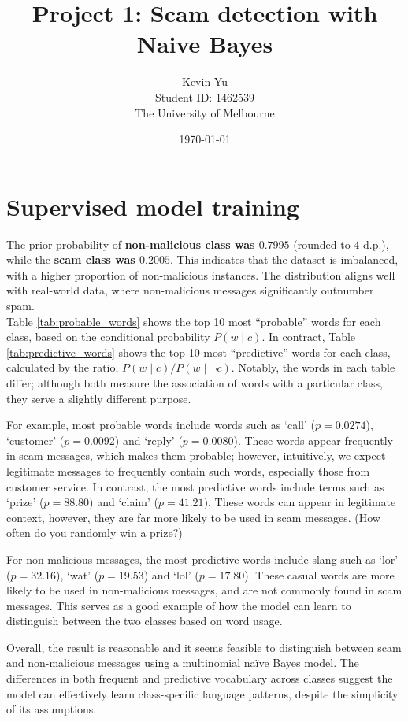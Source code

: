 \documentclass[a4paper,12pt]{article}
\title{Project 1: Scam detection with Naive Bayes}
\author{Kevin Yu \\ Student ID: 1462539 \\ The University of Melbourne}
\date{\today}
\begin{document}
\maketitle

\newpage

\section{Supervised model training}

The prior probability of \textbf{non-malicious class was $0.7995$} (rounded to $4$ d.p.), while the \textbf{scam class was $0.2005$}. This indicates that the dataset is imbalanced, with a higher proportion of non-malicious instances. The distribution aligns well with real-world data, where non-malicious messages significantly outnumber spam. \\

Table \ref{tab:probable_words} shows the top 10 most ``probable'' words for each class, based on the conditional probability $P(w \mid c)$. In contract, Table \ref{tab:predictive_words} shows the top 10 most ``predictive'' words for each class, calculated by the ratio, $P(w \mid c) / P(w \mid \neg c)$. Notably, the words in each table differ; although both measure the association of words with a particular class, they serve a slightly different purpose. 

For example, most probable words include words such as `call' ($p = 0.0274$), `customer' ($p = 0.0092$) and `reply' ($p = 0.0080$). These words appear frequently in scam messages, which makes them probable; however, intuitively, we expect legitimate messages to frequently contain such words, especially those from customer service. In contrast, the most predictive words include terms such as `prize' ($p = 88.80$) and `claim' ($p = 41.21$). These words can appear in legitimate context, however, they are far more likely to be used in scam messages. (How often do you randomly win a prize?) 

For non-malicious messages, the most predictive words include slang such as `lor' ($p = 32.16$), `wat' ($p = 19.53$) and `lol' ($p = 17.80$). These casual words are more likely to be used in non-malicious messages, and are not commonly found in scam messages. This serves as a good example of how the model can learn to distinguish between the two classes based on word usage.

Overall, the result is reasonable and it seems feasible to distinguish between scam and non-malicious messages using a multinomial naïve Bayes model. The differences in both frequent and predictive vocabulary across classes suggest the model can effectively learn class-specific language patterns, despite the simplicity of its assumptions.
\end{document}
